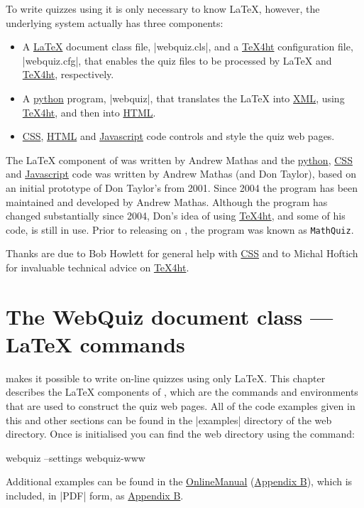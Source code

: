 \documentclass[svgnames]{article}
\newcommand\TeXfht{\href{https://www.ctan.org/tex4ht}{TeX4ht}\xspace}
\newcommand\Ctan{\ctan[]{ctan}}
\newcommand{\HTML}{\href{https://www.w3schools.com/html/html_intro.asp}{HTML}\xspace}
\newcommand\CSS{\href{https://www.w3schools.com/css}{CSS}\xspace}
\newcommand\XML{\href{https://www.w3schools.com/xml/xml_whatis.asp}{XML}\xspace}
\newcommand\Javascript{\href{https://www.w3schools.com/Js/}{Javascript}\xspace}
\newcommand\python[1][python]{\href{https://www.python.org/}{#1}\xspace}
\newcommand\OnlineManual{\href{http://www.maths.usyd.edu.au/u/mathas/WebQuiz/webquiz-online-manual.html}{OnlineManual} (\hyperref[S:online]{Appendix B})\xspace}
\begin{document}
      To write quizzes using \WebQuiz it is only necessary to know
      \LaTeX, however, the underlying \WebQuiz system actually has three
      components:
      \begin{itemize}
        \item A \href{https://www.latex-project.org/}{\LaTeX} document class
        file, \BashCode|webquiz.cls|, and a \TeXfht
        configuration file, \BashCode|webquiz.cfg|, that enables the
        quiz files to be processed by \LaTeX{} and \TeXfht, respectively.
        \item A \python program,
        \BashCode|webquiz|, that translates the
        \LaTeX{} into \XML, using \TeXfht, and then into \HTML.
        \item \CSS, \HTML and \Javascript code controls and style the
        quiz web pages.
      \end{itemize}

     The \LaTeX{} component of \WebQuiz{} was written by Andrew Mathas and
     the \python, \CSS and \Javascript code was written by Andrew Mathas (and
     Don Taylor), based on an initial prototype of Don Taylor's from 2001.
     Since 2004 the program has been maintained and developed by Andrew
     Mathas. Although the program has changed substantially since 2004,
     Don's idea of using \TeXfht, and some of his code, is still
     in use. Prior to releasing \WebQuiz on \Ctan, the program was known
     as \texttt{MathQuiz}.

     Thanks are due to Bob Howlett for general help with \CSS and to
     Michal Hoftich for invaluable technical advice on \TeXfht.

   \section{The WebQuiz document class --- \LaTeX{} commands}
   \label{S:documentclass}

    \WebQuiz makes it possible to write on-line quizzes using only \LaTeX.
    This chapter describes the \LaTeX{} components of \WebQuiz, which are
    the commands and environments that are used to construct the quiz web
    pages. All of the code examples given in this and other sections can
    be found in the \BashCode|examples| directory of the \WebQuiz web
    directory. Once \WebQuiz is initialised you can find the
    \WebQuiz web directory using the command:
    \begin{bashcode}
         webquiz --settings webquiz-www
    \end{bashcode}
    Additional examples can be found in the \OnlineManual, which is
    included, in \BashCode|PDF| form, as \hyperref[S:online]{Appendix B}.
\end{document}
